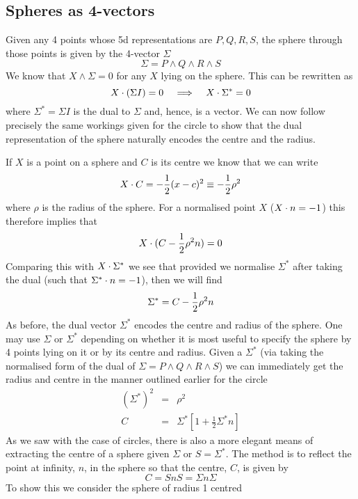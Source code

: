 \subsection{Spheres as 4-vectors}

Given any 4 points whose 5d representations are
$P,Q,R,S$, the sphere through those points is given by
the 4-vector $\Sigma$
%
\[  \Sigma = P\wedge Q \wedge R\wedge S   \]
%
We know that $X \wedge \Sigma = 0 $ for any $X$ lying on
the sphere.  This can be rewritten as
%
\[ X \cdot (\Sigma I) =0  \;\;\; \implies \;\;\; X\cdot \Sigma^{*} = 0  \]
%
where $\Sigma^{*}= \Sigma I$ is the dual to
$\Sigma$ and, hence, is a vector. We can now follow precisely the
same workings given for the circle to show that the dual
representation of the sphere naturally encodes the centre
and the radius.

If $X$ is a point on a sphere and $C$ is its centre we
know that we can write
%
\[  X\cdot C = -\frac{1}{2}(x-c)^2 \equiv -\frac{1}{2}\rho^2  \]
%
where $\rho$ is the radius of the sphere. For a
normalised point $X$ ($X\cdot n = -1$) this therefore
implies that
%
\[ X\cdot (C - \frac{1}{2}\rho^2n) =0 \]
%
Comparing this with $X\cdot \Sigma^*$ we see that provided
we normalise $\Sigma^*$ after taking the dual (such that
$\Sigma^*\cdot n = -1$), then we will find
%
\begin{equation}
   \Sigma^* = C - \frac{1}{2}\rho^2 n
   \end{equation}
%
As before, the dual  vector $\Sigma^*$ encodes the
centre and radius of the sphere. One may
use $\Sigma$ or $\Sigma^*$ depending on whether it is most
useful to specify the sphere by 4 points lying on it or
by its centre and radius. Given a $\Sigma^*$ (via taking
the normalised form of the dual of $\Sigma = P\wedge Q\wedge
R\wedge S $) we can immediately get the radius and centre
in the manner outlined earlier for the circle
%
\begin{eqnarray}
    \left(\Sigma^*\right)^2 &  = &      \rho^2 \\
    C & = &  \Sigma^* \left[ 1 + \frac{1}{2}\Sigma^*n \right]
 \end{eqnarray}
 \label{centre_radius}
As we saw with the case of circles, there is also a more
elegant means of extracting the centre of a sphere given
$\Sigma$ or $S = \Sigma^*$. The method is to reflect the
point at infinity, $n$, in the sphere so that the
centre, $C$, is given by
%
\begin{equation}
  C = SnS = \Sigma n \Sigma
  \end{equation}
%
To show this we consider the sphere of radius 1 centred
